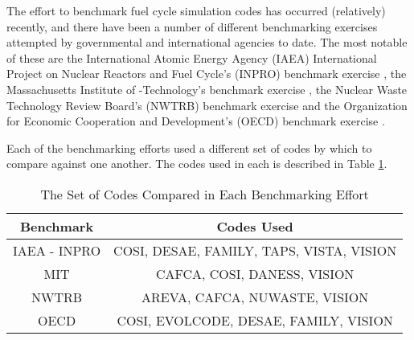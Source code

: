 The effort to benchmark fuel cycle simulation codes has occurred (relatively)
recently, and there have been a number of different benchmarking exercises
attempted by governmental and international agencies to date. The most notable
of these are the International Atomic Energy Agency (IAEA) International Project
on Nuclear Reactors and Fuel Cycle's (INPRO) benchmark
exercise \cite{_international_2009}, the Massachusetts Institute of
-Technology's benchmark exercise \cite{guerin_benchmark_2009}, the Nuclear Waste
Technology Review Board's (NWTRB) benchmark
exercise \cite{abkowitz_workshop_2011,_nuclear_2011} and the Organization for
Economic Cooperation and Development's (OECD) benchmark
exercise \cite{boucher_benchmark_2012}.

Each of the benchmarking efforts used a different set of codes by which to
compare against one another. The codes used in each is described in
Table \ref{tab:benchmark-codes}.

\begin{table} [h!]
\centering
\begin{tabular} {|c|c|} 
\hline
Benchmark    & Codes Used \\
\hline
IAEA - INPRO & COSI, DESAE, FAMILY, TAPS, VISTA, VISION \\
MIT          & CAFCA, COSI, DANESS, VISION \\
NWTRB        & AREVA, CAFCA, NUWASTE, VISION \\
OECD         & COSI, EVOLCODE, DESAE, FAMILY, VISION \\
\hline
\end{tabular}
\caption{The Set of Codes Compared in Each Benchmarking Effort}
\label{tab:benchmark-codes}
\end{table}

